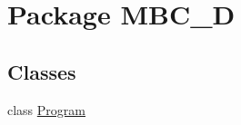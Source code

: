 \hypertarget{namespace_m_b_c__3_d}{\section{Package M\-B\-C\-\_\-D}
\label{namespace_m_b_c__3_d}
}
\subsection*{Classes}
\begin{DoxyCompactItemize}
\item 
class \hyperlink{class_m_b_c__3_d_1_1_program}{Program}
\end{DoxyCompactItemize}
